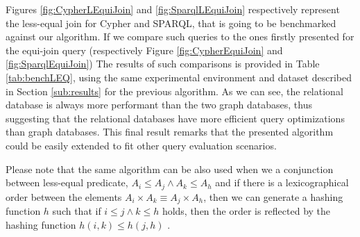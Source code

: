 Figures \ref{fig:CypherLEquiJoin} and \ref{fig:SparqlLEquiJoin} respectively represent the less-equal join for Cypher and SPARQL, that is going to be benchmarked against our algorithm. If we compare such queries to the ones firstly presented for the equi-join query (respectively Figure \vref{fig:CypherEquiJoin} and \ref{fig:SparqlEquiJoin}) The results of such comparisons is provided in Table \ref{tab:benchLEQ}, using the same experimental environment and dataset described in Section \vref{sub:results} for the previous algorithm. As we can see, the relational database is always more performant than the two graph databases, thus suggesting that the relational databases have more efficient query optimizations than graph databases. This final result remarks that the presented algorithm could be easily extended to fit other query evaluation scenarios.

Please note that the same algorithm can be also used when we a conjunction between less-equal predicate, $A_i\leq A_j\wedge A_k\leq A_h$ and if there is a lexicographical order between the elements ${A_i\times A_k}\equiv A_j\times A_h$, then we can generate a hashing function $h$ such that if $i\leq j \wedge k\leq h$ holds, then the order is reflected by the hashing function $h(i,k)\leq h(j,h)$ \cite{BelazzouguiBPV11}.
